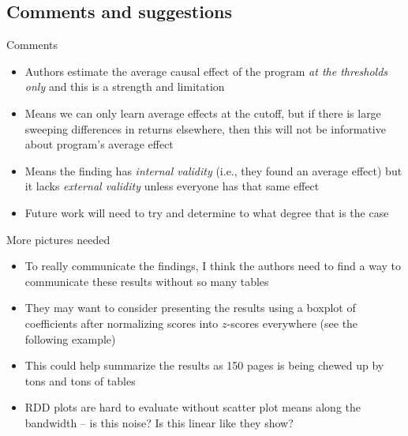 \documentclass{beamer}
\begin{document}
\subsection{Comments and suggestions}

\begin{frame}{Comments}

\begin{itemize}
\item Authors estimate the average causal effect of the program \emph{at the thresholds only} and this is a strength and limitation
\item Means we can only learn average effects at the cutoff, but if there is large sweeping differences in returns elsewhere, then this will not be informative about program's average effect
\item Means the finding has \emph{internal validity} (i.e., they found an average effect) but it lacks \emph{external validity} unless everyone has that same effect
\item Future work will need to try and determine to what degree that is the case 
\end{itemize}

\end{frame}

\begin{frame}{More pictures needed}

\begin{itemize}
\item To really communicate the findings, I think the authors need to find a way to communicate these results without so many tables
\item They may want to consider presenting the results using a boxplot of coefficients after normalizing scores into $z$-scores everywhere (see the following example)
\item This could help summarize the results as 150 pages is being chewed up by tons and tons of tables
\item RDD plots are hard to evaluate without scatter plot means along the bandwidth -- is this noise? Is this linear like they show?

\end{itemize}

\end{frame}
\end{document}
